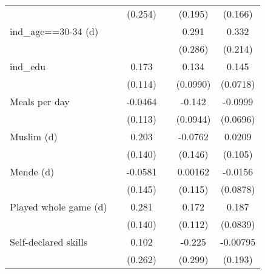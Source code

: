 {\begin{tabular}{l*{5}{c}}
                    &                     &     (0.254)         &                     &     (0.195)         &     (0.166)         \\
[1em]
ind\_age==30-34 (d)  &                     &                     &                     &       0.291         &       0.332         \\
                    &                     &                     &                     &     (0.286)         &     (0.214)         \\
[1em]
ind\_edu             &                     &       0.173         &                     &       0.134         &       0.145\sym{**} \\
                    &                     &     (0.114)         &                     &    (0.0990)         &    (0.0718)         \\
[1em]
Meals per day       &                     &     -0.0464         &                     &      -0.142         &     -0.0999         \\
                    &                     &     (0.113)         &                     &    (0.0944)         &    (0.0696)         \\
[1em]
Muslim (d)          &                     &       0.203         &                     &     -0.0762         &      0.0209         \\
                    &                     &     (0.140)         &                     &     (0.146)         &     (0.105)         \\
[1em]
Mende (d)           &                     &     -0.0581         &                     &     0.00162         &     -0.0156         \\
                    &                     &     (0.145)         &                     &     (0.115)         &    (0.0878)         \\
[1em]
Played whole game (d)&                     &       0.281\sym{**} &                     &       0.172         &       0.187\sym{**} \\
                    &                     &     (0.140)         &                     &     (0.112)         &    (0.0839)         \\
[1em]
Self-declared skills&                     &       0.102         &                     &      -0.225         &    -0.00795         \\
                    &                     &     (0.262)         &                     &     (0.299)         &     (0.193)         \\

\end{tabular}}
